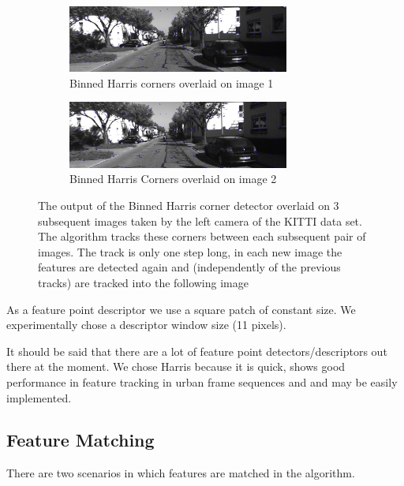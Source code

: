 \documentclass[10pt]{article}         %
\begin{document}
\begin{figure}
    \centering
    \begin{subfigure}[b]{\textwidth}
    \includegraphics[width=0.8\textwidth]{corners1}
    \caption{Binned Harris corners overlaid on image 1}
    \label{fig:corner_image1}
    \end{subfigure}
    \begin{subfigure}[b]{\textwidth}
    \includegraphics[width=0.8\textwidth]{corners2}
    \caption{Binned Harris Corners overlaid on image 2}
    \label{fig:corner_image1}
    \end{subfigure}
    \caption{The output of the Binned Harris corner detector overlaid on 3 subsequent images taken by the left camera of the KITTI data set.  The algorithm tracks these corners between each subsequent pair of images. The track is only one step long, in each new image the features are detected again and (independently of the previous tracks) are tracked into the following image}
\end{figure}

As a feature point descriptor we use a square patch of constant size. We experimentally chose a descriptor window size (11 pixels).

It should be said that there are a lot of feature point detectors/descriptors out there at the moment.  We chose Harris because it is quick, shows good performance in feature tracking in urban frame sequences and and may be easily implemented.

\subsection{Feature Matching}
There are two scenarios in which features are matched in the algorithm.
\end{document}
